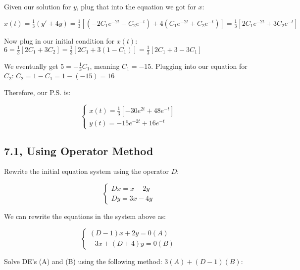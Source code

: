\documentclass{article}
\begin{document}
\noindent Given our solution for $y$, plug that into the equation we got for $x$:\par
\noindent $x(t) = \frac{1}{3}(y' + 4y) = \frac{1}{3}[(-2C_{1}e^{-2t} - C_{2}e^{-t}) + 4(C_{1}e^{-2t} + C_{2}e^{-t})] = \frac{1}{3}[2C_{1}e^{-2t} + 3C_{2}e^{-t}]$ \par
\noindent Now plug in our initial condition for $x(t)$: $6 = \frac{1}{3}[2C_{1} + 3C_{2}] = \frac{1}{3}[2C_{1} + 3(1 - C_{1})] = \frac{1}{3}[2C_{1} + 3 - 3C_{1}]$ \par
\noindent We eventually get $5 = -\frac{1}{3}C_{1}$, meaning $C_{1} = -15$.  Plugging into our equation for $C_{2}$: $C_{2} = 1 - C_{1} = 1 - (-15) = 16$ \par\vspace{0.25cm}

\noindent Therefore, our P.S. is:\par
\noindent $$
\begin{cases}
x(t) = \frac{1}{3}[-30e^{2t} + 48e^{-t}] \\
y(t) = -15e^{-2t} + 16e^{-t}
\end{cases}
$$ 
\par\vspace{0.25cm}

\subsection{7.1, Using Operator Method}
Rewrite the initial equation system using the operator $D$: \par\vspace{0.25cm}

\noindent $$
\begin{cases}
Dx = x - 2y \\
Dy = 3x - 4y
\end{cases}
$$ \par\vspace{0.25cm}

\noindent We can rewrite the equations in the system above as: \par\vspace{0.25cm}

\noindent $$
\begin{cases}
(D - 1)x + 2y = 0 (A)\\
-3x + (D + 4)y = 0 (B)
\end{cases}
$$ \par\vspace{0.25cm}

\noindent Solve DE's (A) and (B) using the following method: $3(A) + (D - 1)(B)$: \par\vspace{0.25cm}
\end{document}
